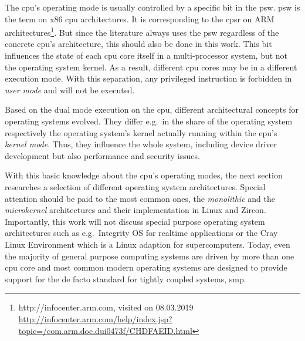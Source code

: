 The \ac{cpu}'s operating mode is usually controlled by a specific bit in the \ac{psw}\cite{tanenbaum-modern-operating-systems}.
\ac{psw} is the term on x86 \ac{cpu} architectures. 
It is corresponding to the \ac{cpsr} on ARM architectures\footnote{http://infocenter.arm.com, visited on 08.03.2019\\ \url{http://infocenter.arm.com/help/index.jsp?topic=/com.arm.doc.dui0473f/CHDFAEID.html}}.
But since the literature always uses the \ac{psw} regardless of the concrete \ac{cpu}'s architecture, this should also be done in this work.
This bit influences the state of each \ac{cpu} core itself in a multi-processor system, but not the operating system kernel.
As a result, different \ac{cpu} cores may be in a different execution mode\cite{lfd430}.
With this separation, any privileged instruction is forbidden in \textit{user mode} and will not be executed.

Based on the dual mode execution on the \ac{cpu}, different architectural concepts for operating systems evolved.
They differ e.g.\ in the share of the operating system respectively the operating system's kernel actually running within the \ac{cpu}'s \textit{kernel mode}. 
Thus, they influence the whole system, including device driver development but also performance and security issues.

With this basic knowledge about the \ac{cpu}'s operating modes, the next section researches a selection of different operating system architectures.
Special attention should be paid to the most common ones, the \textit{monolithic} and the \textit{microkernel} architectures and their implementation in Linux and Zircon.
Importantly, this work will not discuss special purpose operating system architectures such as e.g.\ Integrity OS for realtime applications or the Cray Linux Environment which is a Linux adaption for supercomputers.
Today, even the majority of general purpose computing systems are driven by more than one \ac{cpu} core and most common modern operating systems are designed to provide support for the de facto standard for tightly coupled systems, \ac{smp}.


